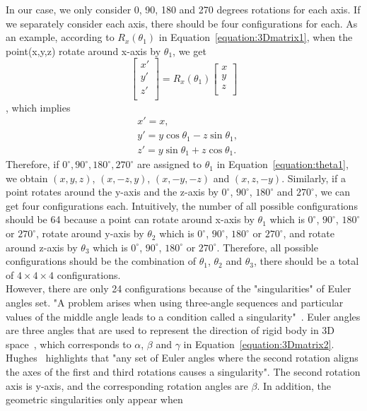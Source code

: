 In our case, we only consider 0, 90, 180 and 270 degrees rotations for each axis. If we separately consider each axis, there should be four configurations for each. As an example, according to $R_{x}(\theta_{1})$ in Equation~\ref{equation:3Dmatrix1}, when the point(x,y,z) rotate around x-axis by $\theta_{1}$, we get
\begin{equation}
\begin{bmatrix}
x'\\
y'\\
z'\\
\end{bmatrix}
=R_{x}(\theta_{1})
\begin{bmatrix}
x\\
y\\
z\\
\end{bmatrix}
\end{equation}, which implies
\begin{equation}
\label{equation:theta1}
\begin{aligned}
&x'=x,\\
&y'=y\cos\theta_{1}-z\sin\theta_{1},\\
&z'=y\sin\theta_{1}+z\cos\theta_{1}.
\end{aligned}
\end{equation}
Therefore, if $0^{\circ}, 90^{\circ}, 180^{\circ}, 270^{\circ}$ are assigned to $\theta_{1}$ in Equation~\ref{equation:theta1}, we obtain $(x,y,z)$, $(x,-z,y)$, $(x,-y,-z)$ and $(x,z,-y)$.
Similarly, if a point rotates around the y-axis and the z-axis by $0^{\circ}$, $90^{\circ}$, $180^{\circ}$ and $270^{\circ}$, we can get four configurations each. Intuitively, the number of all possible configurations should be 64 because a point can rotate around x-axis by $\theta_{1}$ which is $0^{\circ}$, $90^{\circ}$, $180^{\circ}$ or $270^{\circ}$, rotate around y-axis by $\theta_{2}$ which is $0^{\circ}$, $90^{\circ}$, $180^{\circ}$ or $270^{\circ}$, and rotate around z-axis by $\theta_{3}$ which is $0^{\circ}$, $90^{\circ}$, $180^{\circ}$ or $270^{\circ}$. Therefore, all possible configurations should be the combination of $\theta_{1}$, $\theta_{2}$ and $\theta_{3}$, there should be a total of $4\times 4 \times 4$ configurations. 
\\However, there are only 24 configurations because of the "singularities" of Euler angles set. "A problem arises when using three-angle sequences and particular values of the middle angle leads to a condition called a singularity"~\cite{r29}. Euler angles are three angles that are used to represent the direction of rigid body in 3D space~\cite{r24}, which corresponds to $\alpha$, $\beta$ and $\gamma$ in Equation~\ref{equation:3Dmatrix2}. Hughes~\cite{r19} highlights that "any set of Euler angles where the second rotation aligns the axes of the first and third rotations causes a singularity". The second rotation axis is y-axis, and the corresponding rotation angles are $\beta$. In addition, the geometric singularities only appear when
